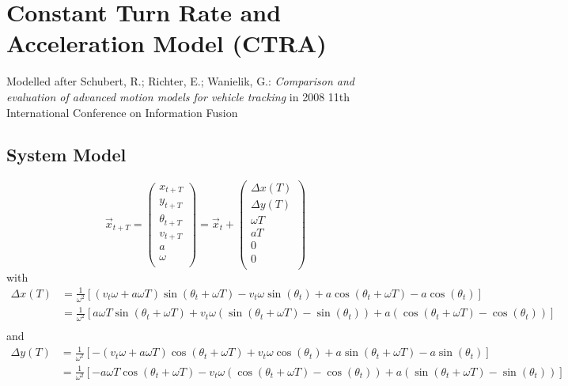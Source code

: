 \documentclass{article}
\begin{document}
\section{Constant Turn Rate and Acceleration Model (CTRA)} %
Modelled after Schubert, R.; Richter, E.; Wanielik, G.: \emph{Comparison and evaluation of advanced motion models for vehicle tracking} in 2008 11th International Conference on Information Fusion

\subsection{System Model}

\[
    \vec x_{t+T} = 
    \begin{pmatrix}
        x_{t+T} \\
        y_{t+T} \\
        \theta_{t+T} \\
        v_{t+T} \\
        a \\
        \omega \\
    \end{pmatrix}
    =
    \vec x_t +
    \begin{pmatrix}
        \Delta x(T) \\
        \Delta y(T) \\
        \omega T \\
        a T \\
        0 \\
        0 \\
    \end{pmatrix}
\]
with
\begin{align*}
    \Delta x(T) &=
    \frac{1}{\omega^2} 
    \left[
        (v_t\omega + a\omega T) \sin(\theta_t + \omega T)
        -v_t\omega \sin(\theta_t)
        +a\cos(\theta_t + \omega T)
        -a\cos(\theta_t)
    \right] \\
    &=     \frac{1}{\omega^2} 
    \left[
        a\omega T \sin(\theta_t + \omega T)
        +v_t\omega ( \sin(\theta_t + \omega T) - \sin(\theta_t) )
        +a( \cos(\theta_t + \omega T) - \cos(\theta_t) )
    \right] \\
\end{align*}
and
\begin{align*}
    \Delta y(T) &=
    \frac{1}{\omega^2} 
    \left[
        -(v_t\omega + a\omega T) \cos(\theta_t + \omega T)
        +v_t\omega \cos(\theta_t)
        +a\sin(\theta_t + \omega T)
        -a\sin(\theta_t)
    \right] \\
    &= 
    \frac{1}{\omega^2} 
    \left[
        -a\omega T \cos(\theta_t + \omega T)
        -v_t\omega ( \cos(\theta_t + \omega T) - \cos(\theta_t) )
        +a( \sin(\theta_t + \omega T) - \sin(\theta_t) )
    \right] \\
\end{align*}
\end{document}
